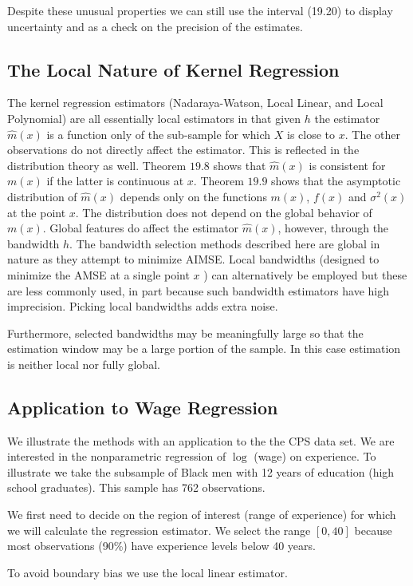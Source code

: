 \documentclass[10pt]{article}
\begin{document}
Despite these unusual properties we can still use the interval (19.20) to display uncertainty and as a check on the precision of the estimates.

\subsection{The Local Nature of Kernel Regression}
The kernel regression estimators (Nadaraya-Watson, Local Linear, and Local Polynomial) are all essentially local estimators in that given $h$ the estimator $\widehat{m}(x)$ is a function only of the sub-sample for which $X$ is close to $x$. The other observations do not directly affect the estimator. This is reflected in the distribution theory as well. Theorem $19.8$ shows that $\widehat{m}(x)$ is consistent for $m(x)$ if the latter is continuous at $x$. Theorem $19.9$ shows that the asymptotic distribution of $\widehat{m}(x)$ depends only on the functions $m(x)$, $f(x)$ and $\sigma^{2}(x)$ at the point $x$. The distribution does not depend on the global behavior of $m(x)$. Global features do affect the estimator $\widehat{m}(x)$, however, through the bandwidth $h$. The bandwidth selection methods described here are global in nature as they attempt to minimize AIMSE. Local bandwidths (designed to minimize the AMSE at a single point $x$ ) can alternatively be employed but these are less commonly used, in part because such bandwidth estimators have high imprecision. Picking local bandwidths adds extra noise.

Furthermore, selected bandwidths may be meaningfully large so that the estimation window may be a large portion of the sample. In this case estimation is neither local nor fully global.

\subsection{Application to Wage Regression}
We illustrate the methods with an application to the the CPS data set. We are interested in the nonparametric regression of $\log$ (wage) on experience. To illustrate we take the subsample of Black men with 12 years of education (high school graduates). This sample has 762 observations.

We first need to decide on the region of interest (range of experience) for which we will calculate the regression estimator. We select the range $[0,40]$ because most observations (90\%) have experience levels below 40 years.

To avoid boundary bias we use the local linear estimator.
\end{document}

